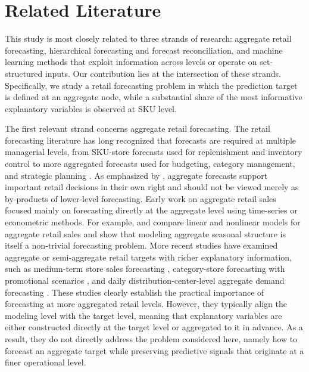 \documentclass[12pt]{article}
\begin{document}
\section{Related Literature}
\label{sec:related_literature}

This study is most closely related to three strands of research: aggregate retail forecasting, hierarchical forecasting and forecast reconciliation, and machine learning methods that exploit information across levels or operate on set-structured inputs. Our contribution lies at the intersection of these strands. Specifically, we study a retail forecasting problem in which the prediction target is defined at an aggregate node, while a substantial share of the most informative explanatory variables is observed at SKU level.

The first relevant strand concerns aggregate retail forecasting. The retail forecasting literature has long recognized that forecasts are required at multiple managerial levels, from SKU-store forecasts used for replenishment and inventory control to more aggregated forecasts used for budgeting, category management, and strategic planning \parencite{SYNTETOS20161}. As emphasized by \textcite{fildes2022retail}, aggregate forecasts support important retail decisions in their own right and should not be viewed merely as by-products of lower-level forecasting. Early work on aggregate retail sales focused mainly on forecasting directly at the aggregate level using time-series or econometric methods. For example, \textcite{alon2001aggregate} and \textcite{chu2003aggregate} compare linear and nonlinear models for aggregate retail sales and show that modeling aggregate seasonal structure is itself a non-trivial forecasting problem. More recent studies have examined aggregate or semi-aggregate retail targets with richer explanatory information, such as medium-term store sales forecasting \parencite{ali2016multiperiod}, category-store forecasting with promotional scenarios \parencite{ali2020automatic}, and daily distribution-center-level aggregate demand forecasting \parencite{hoeltgebaum2021score}. These studies clearly establish the practical importance of forecasting at more aggregated retail levels. However, they typically align the modeling level with the target level, meaning that explanatory variables are either constructed directly at the target level or aggregated to it in advance. As a result, they do not directly address the problem considered here, namely how to forecast an aggregate target while preserving predictive signals that originate at a finer operational level.
\end{document}

